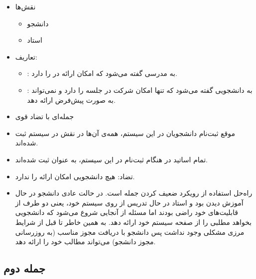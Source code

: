 \documentclass[a4paper]{article}
\begin{document}
\begin{itemize}
    \item نقش‌ها \begin{itemize}
        \item دانشجو
        \item استاد
    \end{itemize}
    \item تعاریف: \begin{itemize}
        \item {}: به مدرسی گفته می‌شود که امکان ارائه در  را
        دارد.
        \item {}: به دانشجویی گفته می‌شود که تنها امکان شرکت در جلسه
        را دارد و نمی‌تواند به صورت پیش‌فرض ارائه دهد.
    \end{itemize}
    \item جمله‌ای با تضاد قوی
    \item موقع ثبت‌نام دانشجویان در این سیستم، همه‌ی آن‌ها در نقش 
    در سیستم ثبت شده‌اند.
    \item تمام اساتید در هنگام ثبت‌نام در این سیستم، به عنوان  ثبت
    شده‌اند.
    \item تضاد: هیچ دانشجویی امکان ارائه را ندارد.
    \item راه‌حل استفاده از رویکرد ضعیف کردن جمله است. در حالت عادی دانشجو در
    حال آموزش دیدن بود و استاد در حال تدریس از روی سیستم خود، یعنی دو طرف از
    قابلیت‌های خود راضی بودند اما مسئله از آنجایی شروع می‌شود که دانشجویی بخواهد
    مطلبی را از صفحه سیستم خود ارائه دهد. به همین خاطر تا قبل از شرایط مرزی
    مشکلی وجود نداشت پس دانشجو با دریافت مجوز مناسب (به روزرسانی مجوز دانشجو)
    می‌تواند مطالب خود را ارائه دهد.
\end{itemize}

\newpage

\subsection*{جمله دوم}
\end{document}
